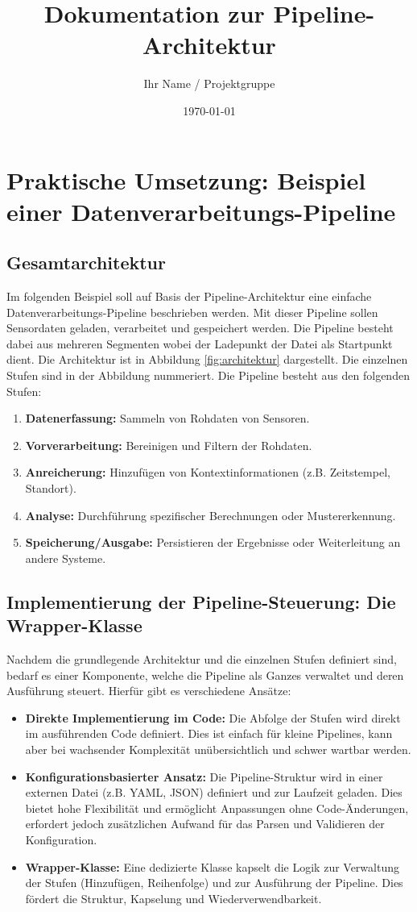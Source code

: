 \documentclass[a4paper]{article} %
\title{Dokumentation zur Pipeline-Architektur}
\author{Ihr Name / Projektgruppe}
\date{\today}
\begin{document}
\section{Praktische Umsetzung: Beispiel einer Datenverarbeitungs-Pipeline}
\subsection{Gesamtarchitektur}
Im folgenden Beispiel soll auf Basis der Pipeline-Architektur eine einfache Datenverarbeitungs-Pipeline beschrieben werden. Mit dieser Pipeline sollen Sensordaten geladen, verarbeitet und gespeichert werden. Die Pipeline besteht dabei aus mehreren Segmenten wobei der Ladepunkt der Datei als Startpunkt dient.
Die Architektur ist in Abbildung \ref{fig:architektur} dargestellt. Die einzelnen Stufen sind in der Abbildung nummeriert.
Die Pipeline besteht aus den folgenden Stufen:
\begin{enumerate}
    \item \textbf{Datenerfassung:} Sammeln von Rohdaten von Sensoren.
    \item \textbf{Vorverarbeitung:} Bereinigen und Filtern der Rohdaten.
    \item \textbf{Anreicherung:} Hinzufügen von Kontextinformationen (z.B. Zeitstempel, Standort).
    \item \textbf{Analyse:} Durchführung spezifischer Berechnungen oder Mustererkennung.
    \item \textbf{Speicherung/Ausgabe:} Persistieren der Ergebnisse oder Weiterleitung an andere Systeme.
\end{enumerate}

\subsection{Implementierung der Pipeline-Steuerung: Die Wrapper-Klasse}
Nachdem die grundlegende Architektur und die einzelnen Stufen definiert sind, bedarf es einer Komponente, welche die Pipeline als Ganzes verwaltet und deren Ausführung steuert. Hierfür gibt es verschiedene Ansätze:

\begin{itemize}
    \item \textbf{Direkte Implementierung im Code:} Die Abfolge der Stufen wird direkt im ausführenden Code definiert. Dies ist einfach für kleine Pipelines, kann aber bei wachsender Komplexität unübersichtlich und schwer wartbar werden.
    \item \textbf{Konfigurationsbasierter Ansatz:} Die Pipeline-Struktur wird in einer externen Datei (z.B. YAML, JSON) definiert und zur Laufzeit geladen. Dies bietet hohe Flexibilität und ermöglicht Anpassungen ohne Code-Änderungen, erfordert jedoch zusätzlichen Aufwand für das Parsen und Validieren der Konfiguration.
    \item \textbf{Wrapper-Klasse:} Eine dedizierte Klasse kapselt die Logik zur Verwaltung der Stufen (Hinzufügen, Reihenfolge) und zur Ausführung der Pipeline. Dies fördert die Struktur, Kapselung und Wiederverwendbarkeit.
\end{itemize}
\end{document}
